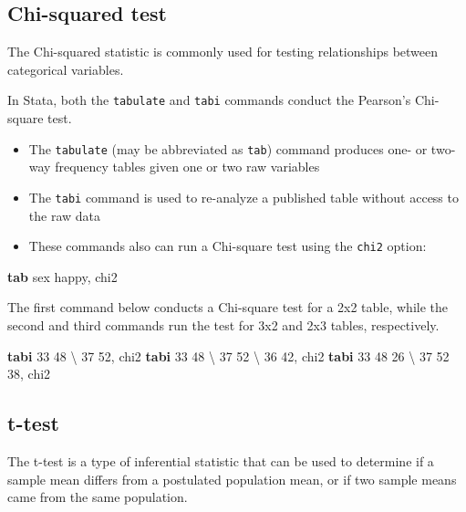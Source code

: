 \documentclass[
]{book}
\newenvironment{Shaded}{\begin{snugshade}}{\end{snugshade}}
\newcommand{\FunctionTok}[1]{\textcolor[rgb]{0.00,0.00,0.00}{#1}}
\newcommand{\KeywordTok}[1]{\textcolor[rgb]{0.13,0.29,0.53}{\textbf{#1}}}
\newcommand{\NormalTok}[1]{#1}
\providecommand{\tightlist}{%
  \setlength{\itemsep}{0pt}\setlength{\parskip}{0pt}}
\begin{document}
\hypertarget{chi-squared-test}{%
\subsection{Chi-squared test}\label{chi-squared-test}}

The Chi-squared statistic is commonly used for testing relationships between categorical variables.

In Stata, both the \texttt{tabulate} and \texttt{tabi} commands conduct the Pearson's Chi-square test.

\begin{itemize}
\tightlist
\item
  The \texttt{tabulate} (may be abbreviated as \texttt{tab}) command produces one- or two-way frequency tables given one or two raw variables
\item
  The \texttt{tabi} command is used to re-analyze a published table without access to the raw data
\item
  These commands also can run a Chi-square test using the \texttt{chi2} option:
\end{itemize}

\begin{Shaded}
\begin{Highlighting}[]
\KeywordTok{tab}\NormalTok{ sex happy, }\FunctionTok{chi2} 
\end{Highlighting}
\end{Shaded}

The first command below conducts a Chi-square test for a 2x2 table, while the second and third commands run the test for 3x2 and 2x3 tables, respectively.

\begin{Shaded}
\begin{Highlighting}[]
\KeywordTok{tabi}\NormalTok{ 33 48 \textbackslash{} 37 52, }\FunctionTok{chi2}
\KeywordTok{tabi}\NormalTok{ 33 48 \textbackslash{} 37 52 \textbackslash{} 36 42, }\FunctionTok{chi2}
\KeywordTok{tabi}\NormalTok{ 33 48 26 \textbackslash{} 37 52 38, }\FunctionTok{chi2}
\end{Highlighting}
\end{Shaded}

\hypertarget{t-test}{%
\subsection{t-test}\label{t-test}}

The t-test is a type of inferential statistic that can be used to determine if a sample mean differs from a postulated population mean, or if two sample means came from the same population.
\end{document}
